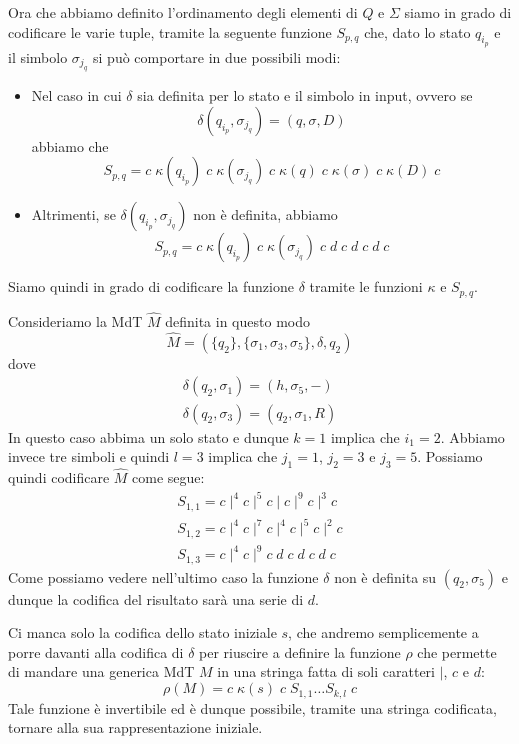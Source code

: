 Ora che abbiamo definito l'ordinamento degli elementi di $Q$ e
$\Sigma$ siamo in grado di codificare le varie tuple, tramite la
seguente funzione $S_{p,q}$ che, dato lo stato $q_{i_p}$ e il
simbolo $\sigma_{j_q}$ si può comportare in due possibili modi:
\begin{itemize}
	\item Nel caso in cui $\delta$ sia definita per lo stato e
	      il simbolo in input, ovvero se
	      \[
		      \delta (q_{i_p}, \sigma_{j_q}) =
		      (q, \sigma, D)
	      \]
	      abbiamo che
	      \[
		      S_{p,q} = c \; \kappa (q_{i_p})
		      \; c \; \kappa (\sigma_{j_q})
		      \; c \; \kappa (q)
		      \; c \; \kappa (\sigma)
		      \; c \; \kappa (D) \; c
	      \]
	\item Altrimenti, se $\delta(q_{i_p}, \sigma_{j_q})$ non è
	      definita, abbiamo
	      \[
		      S_{p,q} = c \; \kappa (q_{i_p})
		      \; c \; \kappa (\sigma_{j_q})
		      \; c \; d \; c \; d \; c \; d \; c
	      \]
\end{itemize}
Siamo quindi in grado di codificare la funzione $\delta$ tramite
le funzioni $\kappa$ e $S_{p,q}$.

\begin{example}
	Consideriamo la MdT $\hat{M}$ definita in questo modo
	\[
		\hat{M} = (\{ q_2 \}, \{ \sigma_1, \sigma_3, \sigma_5 \},
		\delta, q_2)
	\]
	dove
	\begin{gather*}
		\delta(q_2, \sigma_1) = (h, \sigma_5, -) \\
		\delta(q_2, \sigma_3) = (q_2, \sigma_1, R)
	\end{gather*}
	In questo caso abbima un solo stato e dunque $k=1$ implica
	che $i_1=2$. Abbiamo invece tre simboli e quindi $l = 3$
	implica che $j_1 = 1$, $j_2 = 3$ e $j_3 = 5$. Possiamo quindi
	codificare $\hat{M}$ come segue:
	\begin{gather*}
		S_{1,1} = c \mid^4 c \mid^5 c \mid c \mid^9 c \mid^3 c \\
		S_{1,2} = c \mid^4 c \mid^7 c \mid^4 c \mid^5 c \mid^2 c \\
		S_{1,3} = c \mid^4 c \mid^9 c \; d \; c \; d \; c \; d \; c
	\end{gather*}
	Come possiamo vedere nell'ultimo caso la funzione $\delta$
	non è definita su $(q_2, \sigma_5)$ e dunque la codifica
	del risultato sarà una serie di $d$.
\end{example}

Ci manca solo la codifica dello stato iniziale $s$, che andremo
semplicemente a porre davanti alla codifica di $\delta$ per
riuscire a definire la funzione $\rho$ che permette di mandare
una generica MdT $M$ in una stringa fatta di soli caratteri
$\mid$, $c$ e $d$:
\[ \rho(M) = c \; \kappa(s) \; c \; S_{1,1} \dots S_{k,l} \; c \]
Tale funzione è invertibile ed è dunque possibile, tramite una
stringa codificata, tornare alla sua rappresentazione iniziale.

